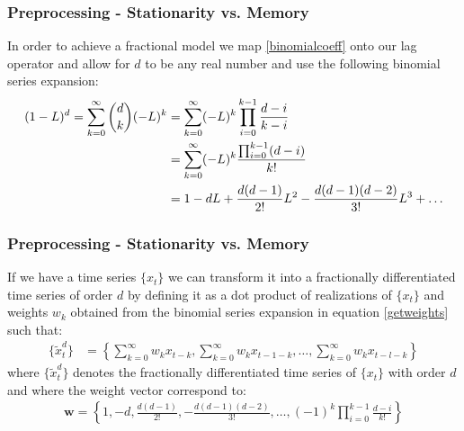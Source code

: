 \documentclass[xcolor=dvipsnames, english, 8pt]{beamer}
\begin{document}
\begin{frame}
    \frametitle{Preprocessing - Stationarity vs. Memory}
     In order to achieve a fractional model we map \eqref{binomialcoeff} onto our lag operator and allow for $d$ to be any real number and use the following binomial series expansion:
    \begin{align}
    	(1-L)^d = \sum\limits_{k=0}^{\infty} \binom{d}{k} (-L)^k &= \sum\limits_{k=0}^{\infty} (-L)^k \prod\limits_{i=0}^{k-1}\frac{d-i}{k-i} \notag \\
    	&=  \sum\limits_{k=0}^{\infty} (-L)^k \frac{\prod_{i=0}^{k-1}(d-i)}{k!} \notag \\
    	&= 1 -dL + \frac{d(d-1)}{2!}L^2 - \frac{d(d-1)(d-2)}{3!}L^3 + \hdots \label{getweights}
    \end{align}
\end{frame}
\begin{frame}
    \frametitle{Preprocessing - Stationarity vs. Memory}
    If we have a time series $\{x_t\}$ we can transform it into a fractionally differentiated time series of order $d$ by defining it as a dot product of realizations of $\{x_t\}$ and weights $w_k$ obtained from the binomial series expansion in equation \eqref{getweights} such that:
    \begin{align}
     \{\tilde{x}_t^d\} &= \left\{\sum\limits_{k=0}^{\infty}w_kx_{t-k}, \sum\limits_{k=0}^{\infty}w_kx_{t-1-k}, \hdots, \sum\limits_{k=0}^{\infty}w_kx_{t-l-k}\right\}
 \end{align}
    where $\{\tilde{x}_t^d\}$ denotes the fractionally differentiated time series of $\{x_t\}$ with order $d$ and where the weight vector correspond to:
    \begin{align}
    	\boldsymbol{w} = \left\{ 1, -d, \frac{d(d-1)}{2!}, -\frac{d(d-1)(d-2)}{3!}, \hdots, (-1)^k\prod\limits_{i=0}^{k-1}\frac{d-i}{k!} \right\} \label{fracweights}
    \end{align}
    \end{frame}
\end{document}

